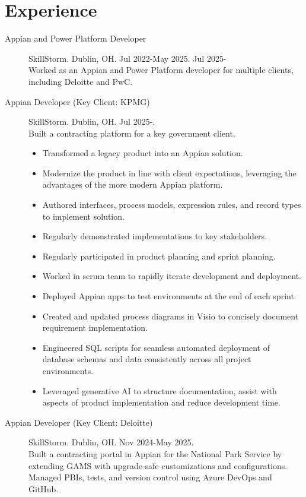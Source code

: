 \documentclass{article}
\begin{document}
\section*{Experience}\vspace{-0.5em}
\begin{description}
  \item[Appian and Power Platform Developer] SkillStorm. Dublin, OH. Jul 2022-May 2025. Jul 2025- \\
  Worked as an Appian and Power Platform developer for multiple clients, including Deloitte and PwC.
  \item[Appian Developer (Key Client: KPMG)] SkillStorm. Dublin, OH. Jul 2025-. \\
  Built a contracting platform for a key government client.
  \begin{itemize}
    \item Transformed a legacy product into an Appian solution.
    \item Modernize the product in line with client expectations, leveraging the advantages of the more modern Appian platform.
    \item Authored interfaces, process models, expression rules, and record types to implement solution.
    \item Regularly demonstrated implementations to key stakeholders.
    \item Regularly participated in product planning and sprint planning.
    \item Worked in scrum team to rapidly iterate development and deployment.
    \item Deployed Appian apps to test environments at the end of each sprint.
    \item Created and updated process diagrams in Visio to concisely document requirement implementation.
    \item Engineered SQL scripts for seamless automated deployment of database schemas and data consistently across all project environments.
    \item Leveraged generative AI to structure documentation, assist with aspects of product implementation and reduce development time.
  \end{itemize}
  \item[Appian Developer (Key Client: Deloitte)] SkillStorm. Dublin, OH. Nov 2024-May 2025. \\
  Built a contracting portal in Appian for the National Park Service by extending GAMS with upgrade-safe customizations and configurations. Managed PBIs, tests, and version control using Azure DevOps and GitHub.

\end{description}
\end{document}
